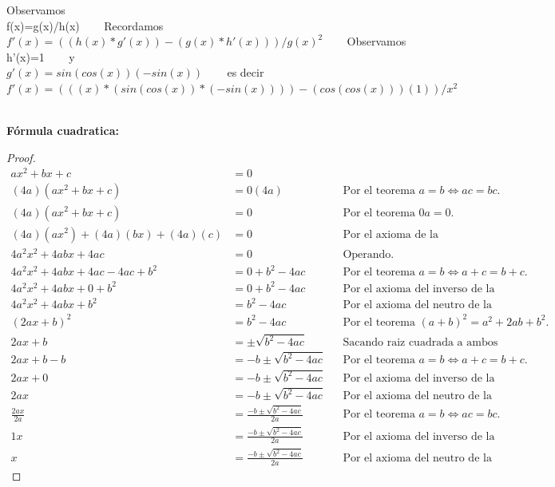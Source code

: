 \documentclass[12pt]{article}
\begin{document}

        Observamos\\
        f(x)=g(x)/h(x)  \ \ \ %
        Recordamos\\
        $f'(x)=((h(x)*g'(x))-(g(x)*h'(x)))/g(x)^2$ \ \ \ %
        Observamos\\
        h'(x)=1 \ \ \ %
        y\\
        $g'(x)=sin(cos(x))(-sin(x))$ \ \ \ %
        es decir\\
        $f'(x)= (((x)*(sin(cos(x))*(-sin(x))))-(cos(cos(x)))(1))/x^2$ \ \ \ %

\hfill

\textbf{F\'ormula cuadratica:}
\begin{proof}
\begin{align*}
    ax^2+bx+c&=0\\
    (4a)(ax^2+bx+c)&=0(4a) \quad &&\text{Por el teorema $a=b \iff ac=bc$.}\\
    (4a)(ax^2+bx+c)&=0 &&\text{Por el teorema $0a=0$.}\\
    (4a)(ax^2)+(4a)(bx)+(4a)(c)&=0 &&\text{Por el axioma de la distributividad.}\\
    4a^2x^2+4abx+4ac&=0 &&\text{Operando.}\\
    4a^2x^2+4abx+4ac-4ac+b^2&=0+b^2-4ac &&\text{Por el teorema $a=b \iff a+c=b+c$.}\\
    4a^2x^2+4abx+0+b^2&=0+b^2-4ac &&\text{Por el axioma del inverso de la suma.}\\
    4a^2x^2+4abx+b^2&=b^2-4ac &&\text{Por el axioma del neutro de la suma.}\\
    (2ax+b)^2&=b^2-4ac &&\text{Por el teorema $(a+b)^2=a^2+2ab+b^2$.}\\
    2ax+b&=\pm \sqrt{b^2-4ac} &&\text{Sacando raiz cuadrada a ambos lados.}\\
    2ax+b-b&=-b \pm \sqrt{b^2-4ac} &&\text{Por el teorema $a=b \iff a+c=b+c$.}\\
    2ax+0&=-b \pm \sqrt{b^2-4ac} &&\text{Por el axioma del inverso de la suma.}\\
    2ax&=-b \pm \sqrt{b^2-4ac} &&\text{Por el axioma del neutro de la suma.}\\
    \frac{2ax}{2a}&=\frac{-b\pm \sqrt{b^2-4ac}}{2a} &&\text{Por el teorema $a=b \iff ac=bc$.}\\
    1x&=\frac{-b\pm \sqrt{b^2-4ac}}{2a} &&\text{Por el axioma del inverso de la multiplicación.}\\
    x&=\frac{-b\pm \sqrt{b^2-4ac}}{2a} &&\text{Por el axioma del neutro de la multiplicación.}
\end{align*}
\end{proof}
\end{document}
